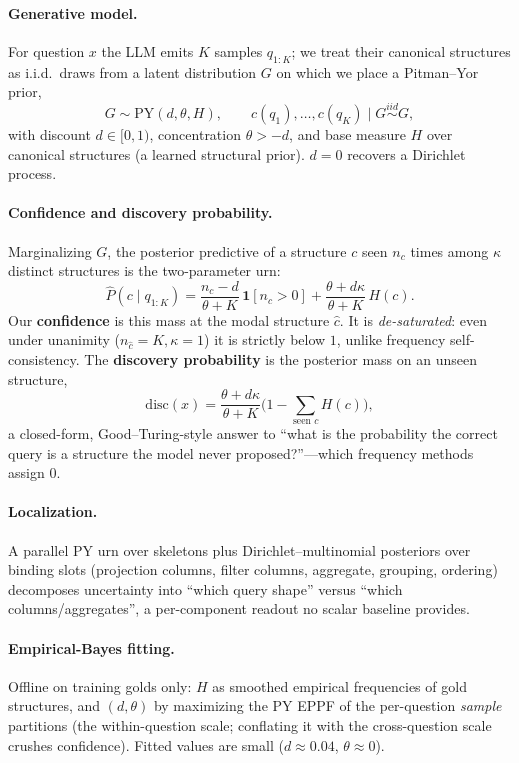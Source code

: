 \documentclass[11pt]{article}
\newcommand{\disc}{\mathrm{disc}}
\begin{document}
\paragraph{Generative model.} For question $x$ the LLM emits $K$ samples $q_{1:K}$; we treat their
canonical structures as i.i.d.\ draws from a latent distribution $G$ on which we place a Pitman--Yor
prior,
\begin{equation}
  G \sim \mathrm{PY}(d,\theta,H), \qquad c(q_1),\dots,c(q_K)\mid G \overset{iid}{\sim} G,
\end{equation}
with discount $d\in[0,1)$, concentration $\theta>-d$, and base measure $H$ over canonical
structures (a learned structural prior). $d=0$ recovers a Dirichlet process.

\paragraph{Confidence and discovery probability.} Marginalizing $G$, the posterior predictive of a
structure $c$ seen $n_c$ times among $\kappa$ distinct structures is the two-parameter urn:
\begin{equation}
  \widehat P(c\mid q_{1:K}) = \frac{n_c-d}{\theta+K}\,\mathbf 1[n_c>0]
  + \frac{\theta+d\kappa}{\theta+K}\,H(c).
\end{equation}
Our \textbf{confidence} is this mass at the modal structure $\hat c$. It is \emph{de-saturated}:
even under unanimity ($n_{\hat c}=K,\kappa=1$) it is strictly below $1$, unlike frequency
self-consistency. The \textbf{discovery probability} is the posterior mass on an unseen structure,
\begin{equation}\label{eq:disc}
  \disc(x) = \frac{\theta+d\kappa}{\theta+K}\Big(1-\!\!\sum_{\text{seen }c}\!H(c)\Big),
\end{equation}
a closed-form, Good--Turing-style answer to ``what is the probability the correct query is a
structure the model never proposed?''---which frequency methods assign $0$.

\paragraph{Localization.} A parallel PY urn over skeletons plus Dirichlet--multinomial posteriors
over binding slots (projection columns, filter columns, aggregate, grouping, ordering) decomposes
uncertainty into ``which query shape'' versus ``which columns/aggregates'', a per-component readout
no scalar baseline provides.

\paragraph{Empirical-Bayes fitting.} Offline on training golds only: $H$ as smoothed empirical
frequencies of gold structures, and $(d,\theta)$ by maximizing the PY EPPF of the per-question
\emph{sample} partitions (the within-question scale; conflating it with the cross-question scale
crushes confidence). Fitted values are small ($d\approx0.04$, $\theta\approx0$).
\end{document}
